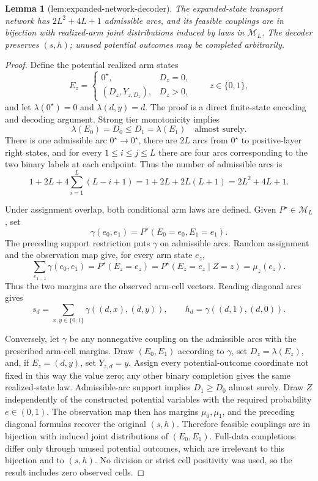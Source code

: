 \documentclass{article}
\newtheorem{lemma}{Lemma}
\begin{document}
\begin{lemma}[lem:expanded-network-decoder]\label{lem:expanded-network-decoder}
The expanded-state transport network has \(2L^2+4L+1\) admissible arcs, and its feasible couplings are in bijection with realized-arm joint distributions induced by laws in \(\mathcal M_L\). The decoder preserves \((s,h)\); unused potential outcomes may be completed arbitrarily.
\end{lemma}
\begin{proof}
Define the potential realized arm states
\[
 E_z=
 \begin{cases}
 0^{\star},&D_z=0,\\
 (D_z,Y_{z,D_z}),&D_z>0,
 \end{cases}
 \qquad z\in\{0,1\},
\]
and let \(\lambda(0^{\star})=0\) and \(\lambda(d,y)=d\).  The proof is a direct finite-state encoding and decoding argument.  Strong tier monotonicity implies
\[
 \lambda(E_0)=D_0\le D_1=\lambda(E_1)
 \quad\text{almost surely}.
\]
There is one admissible arc \(0^{\star}\to0^{\star}\), there are \(2L\) arcs from \(0^{\star}\) to positive-layer right states, and for every \(1\le i\le j\le L\) there are four arcs corresponding to the two binary labels at each endpoint.  Thus the number of admissible arcs is
\[
 1+2L+4\sum_{i=1}^{L}(L-i+1)
 =1+2L+2L(L+1)
 =2L^2+4L+1.
\]

Under assignment overlap, both conditional arm laws are defined.  Given \(P^{\star}\in\mathcal M_L\), set
\[
 \gamma(e_0,e_1)=P^{\star}(E_0=e_0,E_1=e_1).
\]
The preceding support restriction puts \(\gamma\) on admissible arcs.  Random assignment and the observation map give, for every arm state \(e_z\),
\[
 \sum_{e_{1-z}}\gamma(e_0,e_1)
 =P^{\star}(E_z=e_z)
 =P^{\star}(E_z=e_z\mid Z=z)
 =\mu_z(e_z).
\]
Thus the two margins are the observed arm-cell vectors.  Reading diagonal arcs gives
\[
 s_d=\sum_{x,y\in\{0,1\}}
 \gamma((d,x),(d,y)),
 \qquad
 h_d=\gamma((d,1),(d,0)).
\]

Conversely, let \(\gamma\) be any nonnegative coupling on the admissible arcs with the prescribed arm-cell margins.  Draw \((E_0,E_1)\) according to \(\gamma\), set \(D_z=\lambda(E_z)\), and, if \(E_z=(d,y)\), set \(Y_{z,d}=y\).  Assign every potential-outcome coordinate not fixed in this way the value zero; any other binary completion gives the same realized-state law.  Admissible-arc support implies \(D_1\ge D_0\) almost surely.  Draw \(Z\) independently of the constructed potential variables with the required probability \(e\in(0,1)\).  The observation map then has margins \(\mu_0,\mu_1\), and the preceding diagonal formulas recover the original \((s,h)\).  Therefore feasible couplings are in bijection with induced joint distributions of \((E_0,E_1)\).  Full-data completions differ only through unused potential outcomes, which are irrelevant to this bijection and to \((s,h)\).  No division or strict cell positivity was used, so the result includes zero observed cells.
\end{proof}
\end{document}
